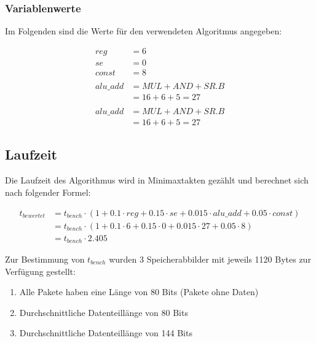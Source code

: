 \subsubsection{Variablenwerte}
\label{subsubsection:Dokumentation-BenchmarkBewertung-Berechnung-Variablen-Variablenwerte}

Im Folgenden sind die Werte für den verwendeten Algoritmus angegeben:

\begin{align*}
    reg      &= 6 \\
    se       &= 0 \\
    const    &= 8 \\ \\
    alu\_add &= MUL + AND + SR.B \\
             &= 16 + 6 + 5 = 27 \\ \\
    alu\_add &= MUL + AND + SR.B \\
             &= 16 + 6 + 5 = 27
\end{align*}

\subsection{Laufzeit}
\label{subsection:Dokumentation-BenchmarkBewertung-Berechnung-Laufzeit}

Die Laufzeit des Algorithmus wird in Minimaxtakten gezählt und berechnet sich nach folgender Formel:

\begin{align*}
    t_{bewertet} &= t_{bench} \cdot (1 + 0.1 \cdot reg + 0.15 \cdot se + 0.015 \cdot alu\_add + 0.05 \cdot const) \\
                 &= t_{bench} \cdot (1 + 0.1 \cdot 6 + 0.15 \cdot 0 + 0.015 \cdot 27 + 0.05 \cdot 8) \\
                 &= t_{bench} \cdot 2.405
\end{align*}

Zur Bestimmung von $t_{bench}$ wurden 3 Speicherabbilder mit jeweils 1120 Bytes zur Verfügung gestellt:

\begin{enumerate}
    \item Alle Pakete haben eine Länge von 80 Bits (Pakete ohne Daten)
    \item Durchschnittliche Datenteillänge von 80 Bits
    \item Durchschnittliche Datenteillänge von 144 Bits
\end{enumerate}

